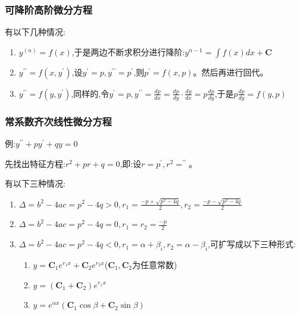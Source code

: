 \documentclass[UTF8]{ctexbook}
\newcommand{\derivative}{^\prime}
\newcommand{\doubleDerivative}{^{\prime\prime}}
\newcommand{\defFunction}[1]{f(#1)}
\newcommand{\mathConstant}{\mathbf{C}}
\begin{document}
{{{{}%

\subsubsection{可降阶高阶微分方程}{
  有以下几种情况:

  \begin{enumerate}
    \item $y^{(n)} = \defFunction{x}$,于是两边不断求积分进行降阶:$y^{n-1} = \int \defFunction{x}dx + \mathConstant$
    \item $y\doubleDerivative = \defFunction{x,y\derivative}$,设$y\derivative = p,y\doubleDerivative = p\derivative$,则$p\derivative = \defFunction{x,p}$。然后再进行回代。
    \item $y\doubleDerivative = \defFunction{y,y\derivative}$,同样的,令$y\derivative = p, y\doubleDerivative = \frac{dp}{dx} = \frac{dp}{dy}\cdot\frac{dy}{dx} = p\frac{dp}{dy}$,于是$p\frac{dp}{dy} = \defFunction{y,p}$
  \end{enumerate}

}%

\subsubsection{常系数齐次线性微分方程}{
  例:$y\doubleDerivative + py\derivative + qy = 0$

  先找出特征方程:$r^2 + pr + q = 0$,即:设$r = p\derivative,r^2 = \doubleDerivative$。

  有以下三种情况:
  \begin{enumerate}
    \item $\Delta = b^2 - 4ac = p^2 - 4q > 0,r_1 = \frac{-p + \sqrt{p^2 - 4q}}{2}, r_2 = \frac{-p - \sqrt{p^2 - 4q}}{2}$
    \item $\Delta = b^2 - 4ac = p^2 - 4q = 0,r_1 = r_2 = \frac{-p}{2}$
    \item {$\Delta = b^2 - 4ac = p^2 - 4q < 0,r_1 = \alpha + \beta_i, r_2 = \alpha - \beta_i$,可扩写成以下三种形式:

          \begin{enumerate}
            \item $y = \mathConstant_1e^{r_1x} + \mathConstant_2e^{r_2x}$($\mathConstant_1,\mathConstant_2$为任意常数)
            \item $y = (\mathConstant_1 + \mathConstant_2)e^{r_1x}$
            \item $y = e^{\alpha x}(\mathConstant_1\cos\beta + \mathConstant_2\sin\beta)$
          \end{enumerate}
          }
  \end{enumerate}

}}}}
\end{document}
